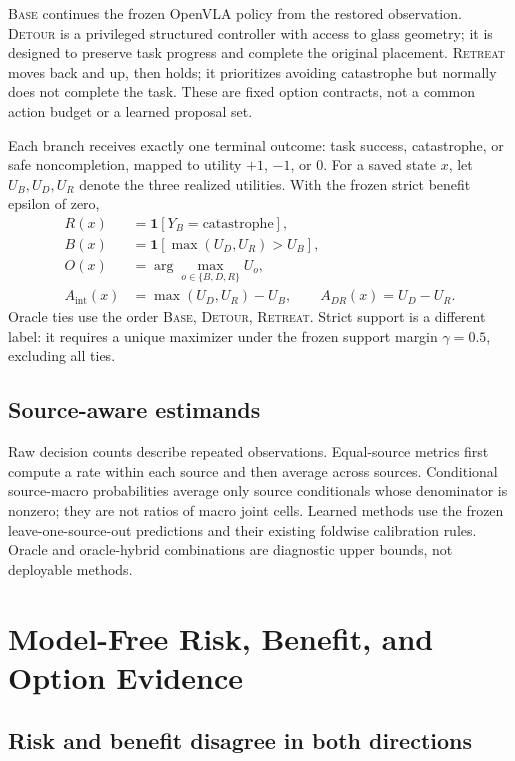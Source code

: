 \documentclass[10pt]{article}
\newcommand{\Base}{\textsc{Base}\xspace}
\newcommand{\Detour}{\textsc{Detour}\xspace}
\newcommand{\Retreat}{\textsc{Retreat}\xspace}
\begin{document}
\Base continues the frozen OpenVLA policy from the restored observation.
\Detour is a privileged structured controller with access to glass geometry;
it is designed to preserve task progress and complete the original placement.
\Retreat moves back and up, then holds; it prioritizes avoiding catastrophe but
normally does not complete the task. These are fixed option contracts, not a
common action budget or a learned proposal set.

Each branch receives exactly one terminal outcome: task success, catastrophe,
or safe noncompletion, mapped to utility $+1$, $-1$, or $0$. For a saved state
$x$, let $U_B,U_D,U_R$ denote the three realized utilities. With the frozen
strict benefit epsilon of zero,
\begin{align}
  R(x) &= \mathbf{1}[Y_B=\mathrm{catastrophe}],\\
  B(x) &= \mathbf{1}[\max(U_D,U_R)>U_B],\\
  O(x) &= \arg\max_{o\in\{B,D,R\}} U_o,\\
  A_{\mathrm{int}}(x)&=\max(U_D,U_R)-U_B,\qquad
  A_{DR}(x)=U_D-U_R.
\end{align}
Oracle ties use the order \Base, \Detour, \Retreat. Strict support is a
different label: it requires a unique maximizer under the frozen support margin
$\gamma=0.5$, excluding all ties.

\subsection{Source-aware estimands}

Raw decision counts describe repeated observations. Equal-source metrics first
compute a rate within each source and then average across sources. Conditional
source-macro probabilities average only source conditionals whose denominator
is nonzero; they are not ratios of macro joint cells. Learned methods use the
frozen leave-one-source-out predictions and their existing foldwise calibration
rules. Oracle and oracle-hybrid combinations are diagnostic upper bounds, not
deployable methods.

\section{Model-Free Risk, Benefit, and Option Evidence}

\subsection{Risk and benefit disagree in both directions}
\end{document}

